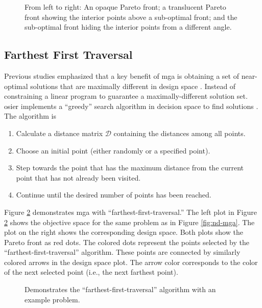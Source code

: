 \begin{figure}[H]
  \centering
  \resizebox{1\columnwidth}{!}{}
  \caption{From left to right: An opaque Pareto front; a translucent Pareto front 
  showing the interior points above a sub-optimal front; and the sub-optimal front 
  hiding the interior points from a different angle.}
  \label{fig:3d-mga}
\end{figure}

\subsection{Farthest First Traversal}
Previous studies emphasized that a key benefit of \ac{mga} is
obtaining a set of near-optimal solutions that are maximally different in design
space \cite{decarolis_modelling_2016,yue_review_2018}. Instead of
constraining a linear program to guarantee a maximally-different solution set.
\ac{osier} implements a ``greedy'' search algorithm in decision space to find
solutions \cite{hochbaum_best_1985}. The algorithm is
\begin{enumerate}
  \item Calculate a distance matrix $\mathcal{D}$ containing the distances among
  all points. 
  \item Choose an initial point (either randomly or a specified point).
  \item Step towards the point that has the maximum distance from the current
  point that has not already been visited.
  \item Continue until the desired number of points has been reached.
\end{enumerate}

Figure \ref{fig:mga-fft} demonstrates \ac{mga} with
``farthest-first-traversal.'' The left plot in Figure \ref{fig:mga-fft} shows
the objective space for the same problem as in Figure \ref{fig:nd-mga}. The plot
on the right shows the corresponding design space. Both plots show the Pareto
front as red dots. The colored dots represent the points selected by the ``farthest-first-traversal''
algorithm. These points are connected by similarly colored arrows in the design space plot. The arrow
color corresponds to the color of the next selected point (i.e., the next farthest point).

\begin{figure}[H]
  \centering
  \resizebox{1\columnwidth}{!}{}
  \caption{Demonstrates the ``farthest-first-traversal'' algorithm with an example problem.}
  \label{fig:mga-fft}
\end{figure}